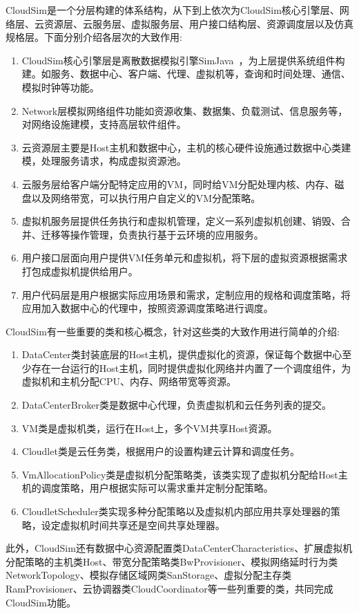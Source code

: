 CloudSim是一个分层构建的体系结构，从下到上依次为CloudSim核心引擎层、网络层、云资源层、云服务层、虚拟服务层、用户接口结构层、资源调度层以及仿真规格层。下面分别介绍各层次的大致作用:
\begin{enumerate}[(1).]
	\item CloudSim核心引擎层是离散数据模拟引擎SimJava~\cite{SimJava1998}，为上层提供系统组件构建。如服务、数据中心、客户端、代理、虚拟机等，查询和时间处理、通信、模拟时钟等功能。
	\item Network层模拟网络组件功能如资源收集、数据集、负载测试、信息服务等，对网络设施建模，支持高层软件组件。
	\item 云资源层主要是Host主机和数据中心，主机的核心硬件设施通过数据中心类建模，处理服务请求，构成虚拟资源池。
	\item 云服务层给客户端分配特定应用的VM，同时给VM分配处理内核、内存、磁盘以及网络带宽，可以执行用户自定义的VM分配策略。
	\item 虚拟机服务层提供任务执行和虚拟机管理，定义一系列虚拟机创建、销毁、合并、迁移等操作管理，负责执行基于云环境的应用服务。
	\item 用户接口层面向用户提供VM任务单元和虚拟机，将下层的虚拟资源根据需求打包成虚拟机提供给用户。
	\item 用户代码层是用户根据实际应用场景和需求，定制应用的规格和调度策略，将应用加入数据中心的代理中，按照资源调度策略进行调度。
\end{enumerate}
CloudSim有一些重要的类和核心概念，针对这些类的大致作用进行简单的介绍:
\begin{enumerate}[1.]
	\item DataCenter类封装底层的Host主机，提供虚拟化的资源，保证每个数据中心至少存在一台运行的Host主机，同时提供虚拟化网络并内置了一个调度组件，为虚拟机和主机分配CPU、内存、网络带宽等资源。
	\item DataCenterBroker类是数据中心代理，负责虚拟机和云任务列表的提交。
	\item VM类是虚拟机类，运行在Host上，多个VM共享Host资源。
	\item Cloudlet类是云任务类，根据用户的设置构建云计算和调度任务。
	\item VmAllocationPolicy类是虚拟机分配策略类，该类实现了虚拟机分配给Host主机的调度策略，用户根据实际可以需求重并定制分配策略。
	\item CloudletScheduler类实现多种分配策略以及虚拟机内部应用共享处理器的策略，设定虚拟机时间共享还是空间共享处理器。
\end{enumerate}

此外，CloudSim还有数据中心资源配置类DataCenterCharacteristics、扩展虚拟机分配策略的主机类Host、带宽分配策略类BwProvisioner、模拟网络延时行为类NetworkTopology、模拟存储区域网类SanStorage、虚拟分配主存类RamProvisioner、云协调器类CloudCoordinator等一些列重要的类，共同完成CloudSim功能。


